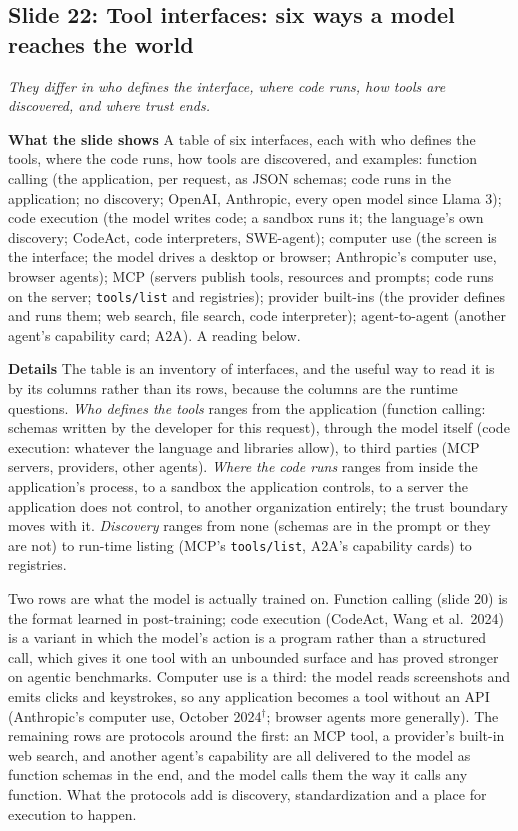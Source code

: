 \documentclass[11pt,letterpaper]{article}
\newcommand{\slide}[3]{%
  \subsection[Slide #1: #2]{Slide #1: #2}%
  {\color{muted}\itshape #3\par}\medskip}
\newcommand{\para}[1]{\medskip\noindent\textbf{#1}\quad}
\begin{document}
\slide{22}{Tool interfaces: six ways a model reaches the world}{They differ in who defines the interface, where code runs, how tools are discovered, and where trust ends.}

\para{What the slide shows} A table of six interfaces, each with who defines the tools, where the code runs, how tools are discovered, and examples: function calling (the application, per request, as JSON schemas; code runs in the application; no discovery; OpenAI, Anthropic, every open model since Llama 3); code execution (the model writes code; a sandbox runs it; the language's own discovery; CodeAct, code interpreters, SWE-agent); computer use (the screen is the interface; the model drives a desktop or browser; Anthropic's computer use, browser agents); MCP (servers publish tools, resources and prompts; code runs on the server; \texttt{tools/list} and registries); provider built-ins (the provider defines and runs them; web search, file search, code interpreter); agent-to-agent (another agent's capability card; A2A). A reading below.

\para{Details} The table is an inventory of interfaces, and the useful way to read it is by its columns rather than its rows, because the columns are the runtime questions. \emph{Who defines the tools} ranges from the application (function calling: schemas written by the developer for this request), through the model itself (code execution: whatever the language and libraries allow), to third parties (MCP servers, providers, other agents). \emph{Where the code runs} ranges from inside the application's process, to a sandbox the application controls, to a server the application does not control, to another organization entirely; the trust boundary moves with it. \emph{Discovery} ranges from none (schemas are in the prompt or they are not) to run-time listing (MCP's \texttt{tools/list}, A2A's capability cards) to registries.

Two rows are what the model is actually trained on. Function calling (slide 20) is the format learned in post-training; code execution (CodeAct, Wang et al.\ 2024) is a variant in which the model's action is a program rather than a structured call, which gives it one tool with an unbounded surface and has proved stronger on agentic benchmarks. Computer use is a third: the model reads screenshots and emits clicks and keystrokes, so any application becomes a tool without an API (Anthropic's computer use, October 2024$^\dagger$; browser agents more generally). The remaining rows are protocols around the first: an MCP tool, a provider's built-in web search, and another agent's capability are all delivered to the model as function schemas in the end, and the model calls them the way it calls any function. What the protocols add is discovery, standardization and a place for execution to happen.
\end{document}
